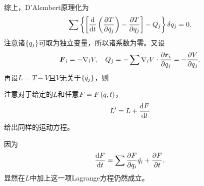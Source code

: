 \documentclass{ctexrep}
\begin{document}
综上，D'Alembert原理化为
\begin{equation}
\label{eq:TLagrange}
\sum\left\{\left[\frac{\mathrm{d}}{\mathrm{d} t}\left(\frac{\partial T}{\partial \dot{q}_j}\right)-\frac{\partial T}{\partial q_j}\right]-Q_j\right\}\delta q_j = 0.
\end{equation}
注意诸$\left\{q_j\right\}$可取为独立变量，所以诸系数为零。又设
\[ \boldsymbol{F}_i = -\nabla_i V, \quad Q_j = -\sum\nabla_i V\cdot\frac{\partial \boldsymbol{r}_i}{\partial q_j} = -\frac{\partial V}{\partial q_j}. \]
再设$L=T-V$且$V$无关于$\left\{\dot{q_j}\right\}$，则
\par
\begin{theorem}[规范不变性]
\label{thm:addftolagrangian}
注意对于给定的$L$和任意$F=F\left(q,t\right)$，
\[ L' = L + \frac{\mathrm{d} F}{\mathrm{d} t} \]
给出同样的运动方程。
\end{theorem}
因为
\[ \frac{\mathrm{d} F}{\mathrm{d} t} = \sum \frac{\partial F}{\partial q_i}\dot{q_i} + \frac{\partial F}{\partial t}. \]
显然在$L$中加上这一项Lagrange方程仍然成立。
\end{document}
